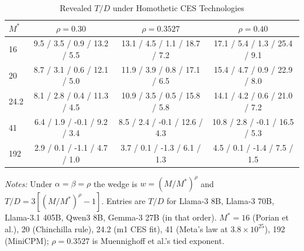 \begin{table}[htbp]
\centering
\scriptsize
\begin{threeparttable}
\caption{Revealed $T/D$ under Homothetic CES Technologies}
\label{tab:m3_homothetic}
\begin{tabular}{@{}lccc@{}}
\toprule
$M^*$ & $\rho=0.30$ & $\rho=0.3527$ & $\rho=0.40$ \\
\midrule
16 & 9.5 / 3.5 / 0.9 / 13.2 / 5.5 & 13.1 / 4.5 / 1.1 / 18.7 / 7.2 & 17.1 / 5.4 / 1.3 / 25.4 / 9.1 \\
20 & 8.7 / 3.1 / 0.6 / 12.1 / 5.0 & 11.9 / 3.9 / 0.8 / 17.1 / 6.5 & 15.4 / 4.7 / 0.9 / 22.9 / 8.0 \\
24.2 & 8.1 / 2.8 / 0.4 / 11.3 / 4.5 & 10.9 / 3.5 / 0.5 / 15.8 / 5.8 & 14.1 / 4.2 / 0.6 / 21.0 / 7.2 \\
41 & 6.4 / 1.9 / -0.1 / 9.2 / 3.4 & 8.5 / 2.4 / -0.1 / 12.6 / 4.3 & 10.8 / 2.8 / -0.1 / 16.5 / 5.3 \\
192 & 2.9 / 0.1 / -1.1 / 4.7 / 1.0 & 3.7 / 0.1 / -1.3 / 6.1 / 1.3 & 4.5 / 0.1 / -1.4 / 7.5 / 1.5 \\
\bottomrule
\end{tabular}
\begin{tablenotes}\footnotesize
\item \textit{Notes:} Under $\alpha=\beta=\rho$ the wedge is $w=(M/M^*)^{\rho}$ and $T/D=3[(M/M^*)^\rho-1]$. Entries are $T/D$ for Llama-3 8B, Llama-3 70B, Llama-3.1 405B, Qwen3 8B, Gemma-3 27B (in that order). $M^*=16$ (Porian et al.), 20 (Chinchilla rule), 24.2 (m1 CES fit), 41 (Meta's law at $3.8\times10^{25}$), 192 (MiniCPM); $\rho=0.3527$ is Muennighoff et al.'s tied exponent.
\end{tablenotes}
\end{threeparttable}
\end{table}
